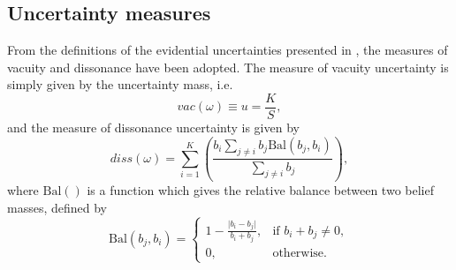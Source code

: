 \documentclass[
twocolumn,
]{ceurart}
\begin{document}
\subsection{Uncertainty measures}
\label{sec::UncertaintyMeasures}
From the definitions of the evidential uncertainties presented in \cite{Josang2018}, the measures of vacuity and dissonance have been adopted.
The measure of vacuity uncertainty is simply given by the uncertainty mass, i.e.
\begin{equation}
    vac(\omega)\equiv u = \frac{K}{S},
\label{eq::vacuity}
\end{equation}
and the measure of dissonance uncertainty is given by
\begin{equation}
    diss(\omega)=\sum_{i=1}^K\left(\frac{b_i\sum_{j\neq i}b_j\textrm{Bal}(b_j,b_i)}{\sum_{j\neq i}b_j}\right),
\end{equation}
where $\textrm{Bal}()$ is a function which gives the relative balance between two belief masses, defined by
\begin{equation}
    \textrm{Bal}(b_j,b_i)=\begin{cases}1-\frac{\vert b_i-b_j\vert}{b_i+b_j},&\text{if } b_i+b_j\neq0,\\
    0,&\text{otherwise.}\end{cases}
\end{equation}
\end{document}
